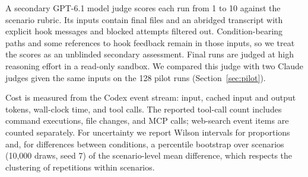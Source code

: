A secondary GPT-6.1 model judge scores each run from 1 to 10 against the scenario rubric. Its inputs contain final files and an abridged transcript with explicit hook messages and blocked attempts filtered out. Condition-bearing paths and some references to hook feedback remain in those inputs, so we treat the scores as an unblinded secondary assessment. Final runs are judged at high reasoning effort in a read-only sandbox. We compared this judge with two Claude judges given the same inputs on the 128 pilot runs (Section~\ref{sec:pilot}).

Cost is measured from the Codex event stream: input, cached input and output tokens, wall-clock time, and tool calls. The reported tool-call count includes command executions, file changes, and MCP calls; web-search event items are counted separately. For uncertainty we report Wilson intervals for proportions and, for differences between conditions, a percentile bootstrap over scenarios (10,000 draws, seed 7) of the scenario-level mean difference, which respects the clustering of repetitions within scenarios.
